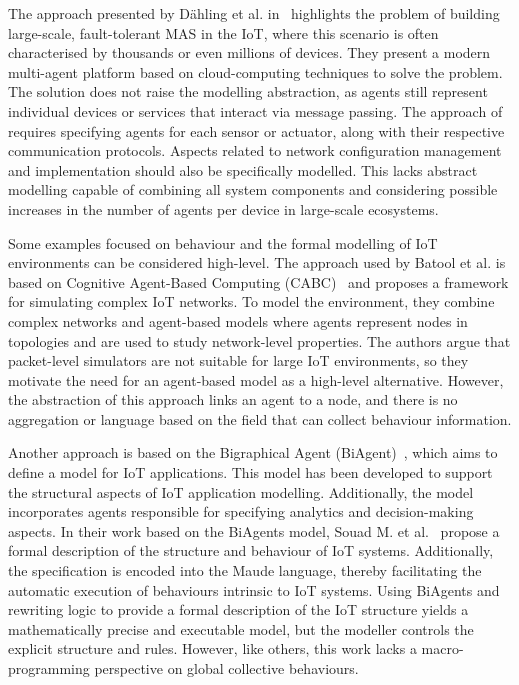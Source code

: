 \documentclass[runningheads]{llncs}
\begin{document}
The approach presented by Dähling et al. in~\cite{DahlingRM21} highlights the problem of building large-scale, fault-tolerant MAS in the IoT, where this scenario is often characterised by thousands or even millions of devices. 
%
They present a modern multi-agent platform based on cloud-computing techniques to solve the problem. The solution does not raise the modelling abstraction, as agents still represent individual devices or services that interact via message passing.
The approach of~\cite{DahlingRM21} requires specifying agents for each sensor or actuator, along with their respective communication protocols. Aspects related to network configuration management and implementation should also be specifically modelled. This lacks abstract modelling capable of combining all system components and considering possible increases in the number of agents per device in large-scale ecosystems.

Some examples focused on behaviour and the formal modelling of IoT environments can be considered high-level. The approach used by Batool et al. is based on Cognitive Agent-Based Computing (CABC)~\cite{BatoolN17} and proposes a framework for simulating complex IoT networks. To model the environment, they combine complex networks and agent-based models where agents represent nodes in topologies and are used to study network-level properties. The authors argue that packet-level simulators are not suitable for large IoT environments, so they motivate the need for an agent-based model as a high-level alternative. However, the abstraction of this approach links an agent to a node, and there is no aggregation or language based on the field that can collect behaviour information.

Another approach is based on the Bigraphical Agent (BiAgent)~\cite{MarirKBB17}, which aims to define a model for IoT applications. This model has been developed to support the structural aspects of IoT application modelling. Additionally, the model incorporates agents responsible for specifying analytics and decision-making aspects.
%
In their work based on the BiAgents model, Souad M. et al.~\cite{SouadFN20} propose a formal description of the structure and behaviour of IoT systems. Additionally, the specification is encoded into the Maude language, thereby facilitating the automatic execution of behaviours intrinsic to IoT systems. 
%
Using BiAgents and rewriting logic to provide a formal description of the IoT structure yields a mathematically precise and executable model, but the modeller controls the explicit structure and rules. However, like others, this work lacks a macro-programming perspective on global collective behaviours.
\end{document}
